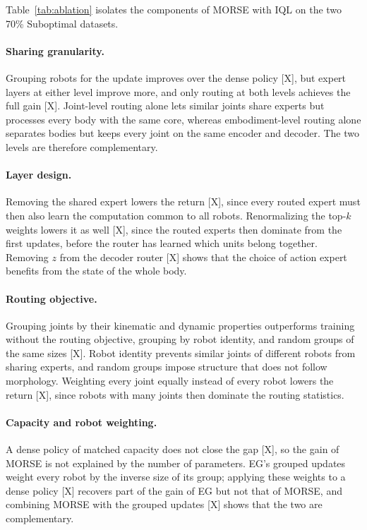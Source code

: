 Table~\ref{tab:ablation} isolates the components of MORSE with IQL on the two 70\% Suboptimal datasets.

\paragraph{Sharing granularity.}
Grouping robots for the update improves over the dense policy [X], but expert layers at either level improve more,
and only routing at both levels achieves the full gain [X]. Joint-level routing alone lets similar joints share
experts but processes every body with the same core, whereas embodiment-level routing alone separates bodies but keeps
every joint on the same encoder and decoder. The two levels are therefore complementary.

\paragraph{Layer design.}
Removing the shared expert lowers the return [X], since every routed expert must then also learn the computation
common to all robots. Renormalizing the top-$k$ weights lowers it as well [X], since the routed experts then dominate
from the first updates, before the router has learned which units belong together. Removing $z$ from the decoder
router [X] shows that the choice of action expert benefits from the state of the whole body.

\paragraph{Routing objective.}
Grouping joints by their kinematic and dynamic properties outperforms training without the routing objective,
grouping by robot identity, and random groups of the same sizes [X]. Robot identity prevents similar joints of
different robots from sharing experts, and random groups impose structure that does not follow morphology. Weighting
every joint equally instead of every robot lowers the return [X], since robots with many joints then dominate the
routing statistics.

\paragraph{Capacity and robot weighting.}
A dense policy of matched capacity does not close the gap [X], so the gain of MORSE is not explained by the number of
parameters. EG's grouped updates weight every robot by the inverse size of its group; applying these weights to a
dense policy [X] recovers part of the gain of EG but not that of MORSE, and combining MORSE with the grouped updates
[X] shows that the two are complementary.

